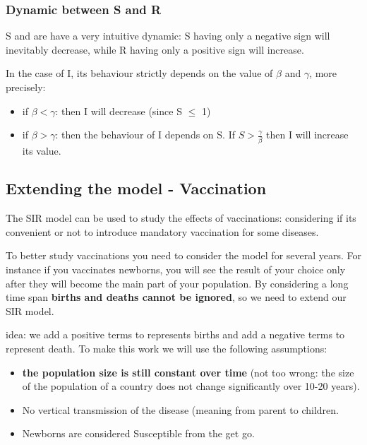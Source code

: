 \subsubsection{Dynamic between S and R}
S and are have a very intuitive dynamic: S having only a negative sign will inevitably decrease, while R having only a positive sign will increase. \par

In the case of I, its behaviour strictly depends on the value of $\beta$ and $\gamma$, more precisely:

\begin{itemize}
    \item if $\beta < \gamma$: then I will decrease (since S $\leq$ 1)
    \item if $\beta > \gamma$: then the behaviour of I depends on S. If $S > \frac{\gamma}{\beta}$ then I will increase its value.
\end{itemize}

\subsection{Extending the model - Vaccination}
The SIR model can be used to study the effects of vaccinations: considering if its convenient or not to introduce mandatory vaccination for some diseases. \par
To better study vaccinations you need to consider the model for several years. For instance if you vaccinates newborns, you will see the result of your choice only after they will become the main part of your population. By considering a long time span \textbf{births and deaths cannot be ignored}, so we need to extend our SIR model.

\par idea: we add a positive terms to represents births and add a negative terms to represent death. To make this work we will use the following assumptions:

\begin{itemize}
    \item \textbf{the population size is still constant over time} (not too wrong: the size of the population of a country does not change significantly over 10-20 years).
    \item No vertical transmission of the disease (meaning from parent to children.
    \item Newborns are considered Susceptible from the get go.
\end{itemize}

